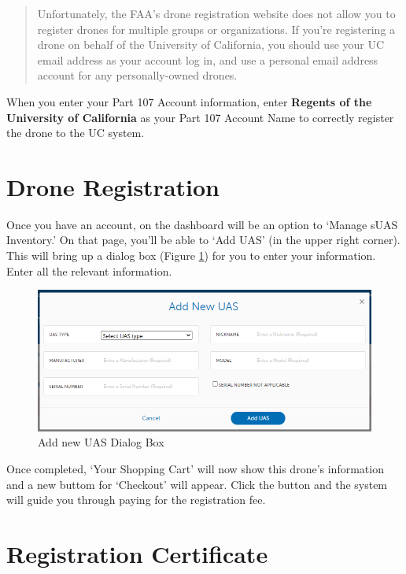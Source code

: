 \documentclass[
]{book}
\begin{document}
\begin{quote}
Unfortunately, the FAA's drone registration website does not allow you to register drones for multiple groups or organizations. If you're registering a drone on behalf of the University of California, you should use your UC email address as your account log in, and use a personal email address account for any personally-owned drones.
\end{quote}

When you enter your Part 107 Account information, enter \textbf{Regents of the University of California} as your Part 107 Account Name to correctly register the drone to the UC system.

\hypertarget{drone-registration}{%
\section{Drone Registration}\label{drone-registration}}

Once you have an account, on the dashboard will be an option to `Manage sUAS Inventory.' On that page, you'll be able to `Add UAS' (in the upper right corner). This will bring up a dialog box (Figure \ref{fig:add-UAS}) for you to enter your information. Enter all the relevant information.

\begin{figure}

{\centering \includegraphics[width=0.8\linewidth]{images/Add_new_UAS} 

}

\caption{Add new UAS Dialog Box}\label{fig:add-UAS}
\end{figure}

Once completed, `Your Shopping Cart' will now show this drone's information and a new buttom for `Checkout' will appear. Click the button and the system will guide you through paying for the registration fee.

\hypertarget{registration-certificate}{%
\section{Registration Certificate}\label{registration-certificate}}
\end{document}

